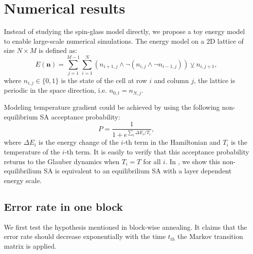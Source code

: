 \documentclass[twocolumn,superscriptaddress,english,showpacs,longbibliography]{revtex4-2}
\newcommand{\vn}{{\mathbf{n}}}
\begin{document}
\section{Numerical results}

Instead of studying the spin-glass model directly, we propose a toy energy model to enable large-scale numerical simulations.
The energy model on a 2D lattice of size $N \times M$ is defined as:
\begin{equation}\label{eq:toy-hamiltonian}
E(\vn) = \sum_{j=1}^{M-1}\sum_{i=1}^{N} (n_{i+1, j} \land \neg(n_{i, j} \land \neg n_{i-1, j})) \veebar n_{i,j+1},
\end{equation}
where $n_{i, j} \in \{0, 1\}$ is the state of the cell at row $i$ and column $j$, the lattice is periodic in the space direction, i.e. $n_{0, t} = n_{N, j}$.

Modeling temperature gradient could be achieved by using the following non-equilibrium SA acceptance probability:
\begin{equation}
    \label{eq:non-equilibrium-SA}
P = \frac{1}{1 + e^{\sum_i \Delta E_i/ T_i}},
\end{equation}
where $\Delta E_i$ is the energy change of the $i$-th term in the Hamiltonian and $T_i$ is the temperature of the $i$-th term.
It is easily to verify that this acceptance probability returns to the Glauber dynamics when $T_i = T$ for all $i$.
In , we show this non-equilibrilium SA is equivalent to an equilibrilium SA with a layer dependent energy scale.



\subsection{Error rate in one block}

We first test the hypothesis mentioned in block-wise annealing. It claims that the error rate 
should decrease exponentially with the time $t_{th}$ the Markov transition matrix is applied.
\end{document}
